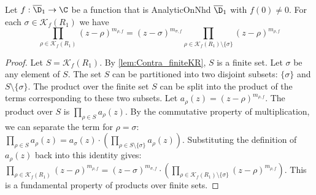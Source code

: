 \begin{lemma}\label{lem:prod_no_sigma1} \leanok {}
Let $f:\overline{\D}_1\to\C$ be a function that is AnalyticOnNhd $\overline{\D}_1$ with $f(0)\neq0$. For each $\sigma \in \mathcal{K}_f(R_1)$ we have
\[\prod_{\rho\in\mathcal{K}_f(R_1)}(z-\rho)^{m_{\rho,f}} =(z-\sigma)^{m_{\sigma,f}}\prod_{\rho\in\mathcal{K}_f(R_1) \setminus\{\sigma\}}(z-\rho)^{m_{\rho,f}} \]
\end{lemma}
\begin{proof}
\leanok
Let $S = \mathcal{K}_f(R_1)$. By \cref{lem:Contra_finiteKR}, $S$ is a finite set. Let $\sigma$ be any element of $S$.
The set $S$ can be partitioned into two disjoint subsets: $\{\sigma\}$ and $S \setminus \{\sigma\}$.
The product over the finite set $S$ can be split into the product of the terms corresponding to these two subsets. Let $a_\rho(z) = (z-\rho)^{m_{\rho,f}}$.
The product over $S$ is $\prod_{\rho \in S} a_\rho(z)$.
By the commutative property of multiplication, we can separate the term for $\rho=\sigma$:
$\prod_{\rho \in S} a_\rho(z) = a_\sigma(z) \cdot \left( \prod_{\rho \in S \setminus \{\sigma\}} a_\rho(z) \right)$.
Substituting the definition of $a_\rho(z)$ back into this identity gives:
$\prod_{\rho\in\mathcal{K}_f(R_1)}(z-\rho)^{m_{\rho,f}} = (z-\sigma)^{m_{\sigma,f}} \cdot \left( \prod_{\rho\in\mathcal{K}_f(R_1) \setminus\{\sigma\}}(z-\rho)^{m_{\rho,f}} \right)$.
This is a fundamental property of products over finite sets.
\end{proof}

